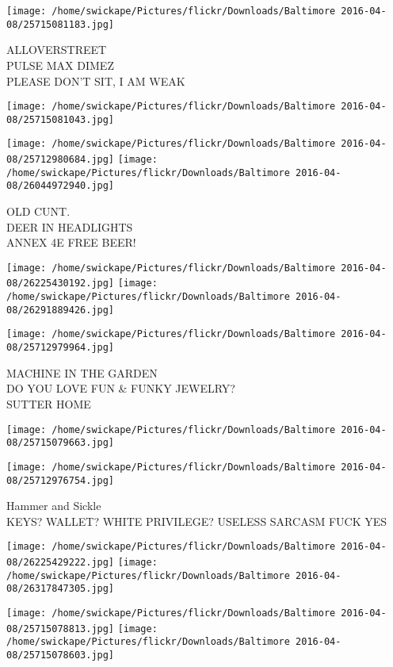 \documentclass[10pt,letterpaper]{article}
\begin{document}
\vspace{0.25in}
\texttt{[image: /home/swickape/Pictures/flickr/Downloads/Baltimore 2016-04-08/25715081183.jpg]}

ALLOVERSTREET\\
PULSE MAX DIMEZ\\
PLEASE DON'T SIT, I AM WEAK
\pagebreak

\texttt{[image: /home/swickape/Pictures/flickr/Downloads/Baltimore 2016-04-08/25715081043.jpg]}

\vspace{0.25in}
\texttt{[image: /home/swickape/Pictures/flickr/Downloads/Baltimore 2016-04-08/25712980684.jpg]}
\texttt{[image: /home/swickape/Pictures/flickr/Downloads/Baltimore 2016-04-08/26044972940.jpg]}

OLD CUNT.\\
DEER IN HEADLIGHTS\\
ANNEX 4E FREE BEER!
\pagebreak

\texttt{[image: /home/swickape/Pictures/flickr/Downloads/Baltimore 2016-04-08/26225430192.jpg]}
\texttt{[image: /home/swickape/Pictures/flickr/Downloads/Baltimore 2016-04-08/26291889426.jpg]}

\texttt{[image: /home/swickape/Pictures/flickr/Downloads/Baltimore 2016-04-08/25712979964.jpg]}

MACHINE IN THE GARDEN\\
DO YOU LOVE FUN \& FUNKY JEWELRY?\\
SUTTER HOME
\pagebreak

\texttt{[image: /home/swickape/Pictures/flickr/Downloads/Baltimore 2016-04-08/25715079663.jpg]}

\vspace{0.25in}
\texttt{[image: /home/swickape/Pictures/flickr/Downloads/Baltimore 2016-04-08/25712976754.jpg]}

Hammer and Sickle\\
KEYS?  WALLET?  WHITE PRIVILEGE?  USELESS SARCASM FUCK YES
\pagebreak

\texttt{[image: /home/swickape/Pictures/flickr/Downloads/Baltimore 2016-04-08/26225429222.jpg]}
\texttt{[image: /home/swickape/Pictures/flickr/Downloads/Baltimore 2016-04-08/26317847305.jpg]}

\texttt{[image: /home/swickape/Pictures/flickr/Downloads/Baltimore 2016-04-08/25715078813.jpg]}
\texttt{[image: /home/swickape/Pictures/flickr/Downloads/Baltimore 2016-04-08/25715078603.jpg]}
\end{document}
